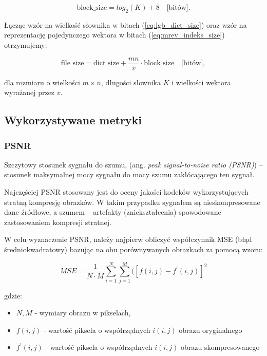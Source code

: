 \documentclass{article}
\begin{document}
\begin{equation}
	\textrm{block\_size} = log_2(K) + 8 \quad  \textrm{[bitów]}.
	\label{eq:mrev_indeks_size}
\end{equation}

Łącząc wzór na wielkość słownika w bitach (\ref{eq:lgb_dict_size}) oraz wzór na reprezentację pojedynczego wektora w bitach (\ref{eq:mrev_indeks_size}) otrzymujemy:

\begin{equation}
	\textrm{file\_size} = \textrm{dict\_size} + \frac{mn}{v} \cdot \textrm{block\_size}  \quad  \textrm{[bitów]},
	\label{eq:lgb_image_size}
\end{equation}

dla rozmiaru o wielkości $m \times n$, długości słownika $K$ i wielkości wektora wyrażanej przez $v$.

\subsection{Wykorzystywane metryki}

\subsubsection{PSNR}

Szczytowy stosunek sygnału do szumu, (ang. \emph{peak signal-to-noise ratio (PSNR)}) – stosunek maksymalnej mocy sygnału do mocy szumu zakłócającego ten sygnał.  

Najczęściej PSNR stosowany jest do oceny jakości kodeków wykorzystujących stratną kompresję obrazków. 
W takim przypadku sygnałem są nieskompresowane dane źródłowe, a szumem – artefakty (zniekształcenia) spowodowane zastosowaniem kompresji stratnej. 

W celu wyznaczenie PSNR, należy najpierw obliczyć współczynnik MSE (błąd średniokwadratowy) bazując na obu porównywanych obrazkach za pomocą wzoru:

\begin{equation}
MSE = \frac{1}{N \cdot M} \sum_{i=1}^N \sum_{j=1}^M ([f(i, j) - f^{'}(i, j)]^2
\end{equation}

gdzie:
\begin{itemize}[label=]
    \item $N, M$ - wymiary obrazu w pikselach,
    \item $f(i, j)$ - wartość piksela o współrzędnych $i(i, j)$ obrazu oryginalnego
    \item $f^{'}(i, j)$ - wartość piksela o współrzędnych $i(i, j)$ obrazu skompresowanego
\end{itemize}
\end{document}
